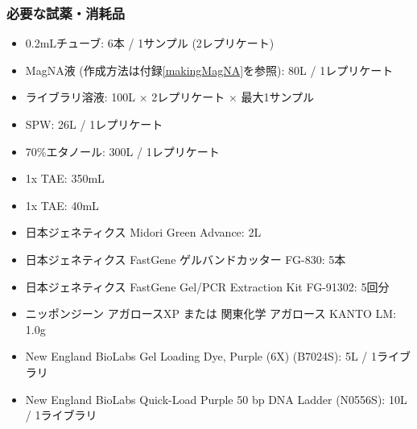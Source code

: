 \documentclass[titlepage,10pt,a4paper,uplatex]{jsbook}
\begin{document}
\subsubsection{必要な試薬・消耗品}
\begin{itemize}
\item 0.2mLチューブ: 6本 / 1サンプル (2レプリケート)
\item MagNA液 (作成方法は付録\ref{makingMagNA}を参照): 80{\textmu}L / 1レプリケート
\item ライブラリ溶液: 100{\textmu}L × 2レプリケート × 最大1サンプル
\item SPW: 26{\textmu}L / 1レプリケート
\item 70\%エタノール: 300{\textmu}L / 1レプリケート
\item 1x TAE: 350mL
\item 1x TAE: 40mL
\item 日本ジェネティクス Midori Green Advance: 2{\textmu}L
\item 日本ジェネティクス FastGene ゲルバンドカッター FG-830: 5本
\item 日本ジェネティクス FastGene Gel/PCR Extraction Kit FG-91302: 5回分
\item ニッポンジーン アガロースXP または 関東化学 アガロース KANTO LM: 1.0g
\item New England BioLabs Gel Loading Dye, Purple (6X) (B7024S): 5{\textmu}L / 1ライブラリ
\item New England BioLabs Quick-Load Purple 50 bp DNA Ladder (N0556S): 10{\textmu}L / 1ライブラリ
\end{itemize}
\end{document}
